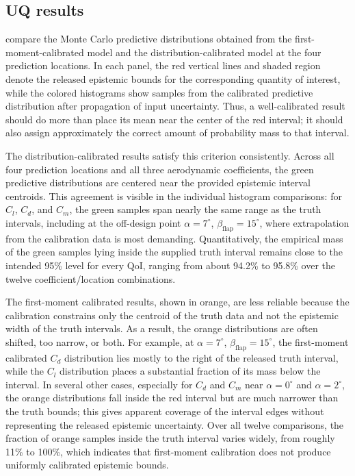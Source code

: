\documentclass[a4paper,12pt]{article}
\begin{document}
\subsection{UQ results}
\label{sec:uq_results}

 compare the Monte Carlo predictive distributions obtained from the first-moment-calibrated model and the distribution-calibrated model at the four prediction locations. In each panel, the red vertical lines and shaded region denote the released epistemic bounds for the corresponding quantity of interest, while the colored histograms show samples from the calibrated predictive distribution after propagation of input uncertainty. Thus, a well-calibrated result should do more than place its mean near the center of the red interval; it should also assign approximately the correct amount of probability mass to that interval.

The distribution-calibrated results satisfy this criterion consistently. Across all four prediction locations and all three aerodynamic coefficients, the green predictive distributions are centered near the provided epistemic interval centroids. This agreement is visible in the individual histogram comparisons: for $C_l$, $C_d$, and $C_m$, the green samples span nearly the same range as the truth intervals, including at the off-design point $\alpha=7^\circ$, $\beta_{\mathrm{flap}}=15^\circ$, where extrapolation from the calibration data is most demanding. Quantitatively, the empirical mass of the green samples lying inside the supplied truth interval remains close to the intended 95\% level for every QoI, ranging from about 94.2\% to 95.8\% over the twelve coefficient/location combinations.

The first-moment calibrated results, shown in orange, are less reliable because the calibration constrains only the centroid of the truth data and not the epistemic width of the truth intervals. As a result, the orange distributions are often shifted, too narrow, or both. For example, at $\alpha=7^\circ$, $\beta_{\mathrm{flap}}=15^\circ$, the first-moment calibrated $C_d$ distribution lies mostly to the right of the released truth interval, while the $C_l$ distribution places a substantial fraction of its mass below the interval. In several other cases, especially for $C_d$ and $C_m$ near $\alpha=0^\circ$ and $\alpha=2^\circ$, the orange distributions fall inside the red interval but are much narrower than the truth bounds; this gives apparent coverage of the interval edges without representing the released epistemic uncertainty. Over all twelve comparisons, the fraction of orange samples inside the truth interval varies widely, from roughly 11\% to 100\%, which indicates that first-moment calibration does not produce uniformly calibrated epistemic bounds.
\end{document}
